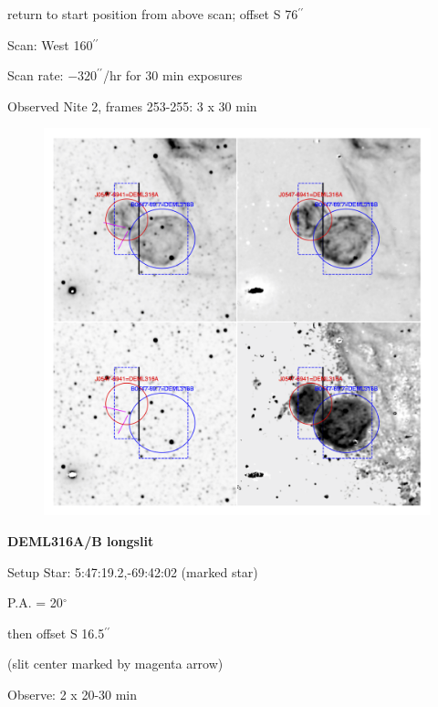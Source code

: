\documentclass[11pt]{article}
\begin{document}
return to start position from above scan; offset S 76$^{\prime\prime}$

Scan:  West 160$^{\prime\prime}$

Scan rate:  $-320 ^{\prime\prime}$/hr for 30 min exposures

Observed Nite 2, frames 253-255:   3 x 30 min
\begin{figure}
\includegraphics[width=10.cm]{snapshots/DEML316ab.png}
\end{figure}

\newpage 

 
{\bf DEML316A/B  longslit}

Setup Star:  5:47:19.2,-69:42:02 (marked star)

P.A. = 20$^\circ$

then offset  S 16.5$^{\prime\prime}$   

  (slit center marked by magenta arrow)

Observe:  2 x 20-30 min
\end{document}

